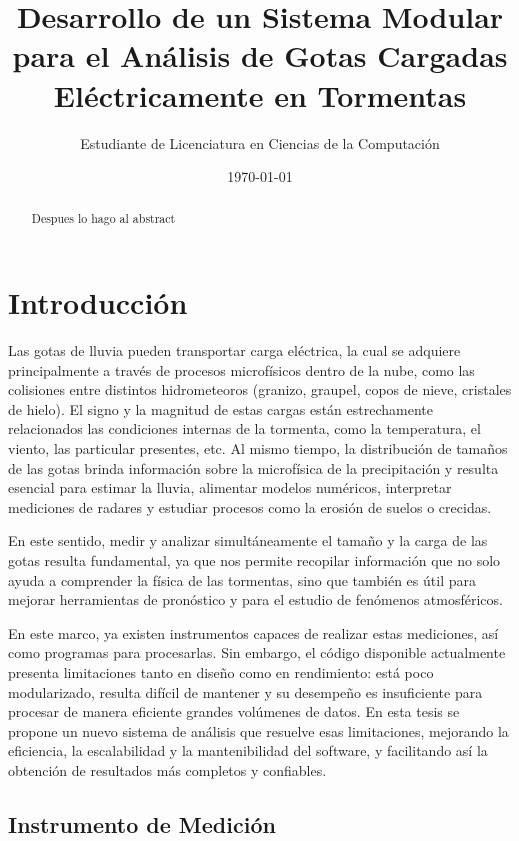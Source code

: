 \documentclass[12pt,a4paper]{article}
\title{\textbf{Desarrollo de un Sistema Modular para el Análisis de Gotas Cargadas Eléctricamente en Tormentas}}
\author{Estudiante de Licenciatura en Ciencias de la Computación}
\date{\today}
\begin{document}
\onehalfspacing

\maketitle

\begin{abstract}
    Despues lo hago al abstract
\end{abstract}

\tableofcontents
\newpage

\section{Introducción}
\lhead{}

Las gotas de lluvia pueden transportar carga eléctrica, la cual se adquiere principalmente a través de procesos microfísicos dentro de la nube, como las colisiones entre distintos hidrometeoros (granizo, graupel, copos de nieve, cristales de hielo). El signo y la magnitud de estas cargas están estrechamente relacionados las condiciones internas de la tormenta, como la temperatura, el viento, las particular presentes, etc. Al mismo tiempo, la distribución de tamaños de las gotas brinda información sobre la microfísica de la precipitación y resulta esencial para estimar la lluvia, alimentar modelos numéricos, interpretar mediciones de radares y estudiar procesos como la erosión de suelos o crecidas.

En este sentido, medir y analizar simultáneamente el tamaño y la carga de las gotas resulta fundamental, ya que nos permite recopilar información que no solo ayuda a comprender la física de las tormentas, sino que también es útil para mejorar herramientas de pronóstico y para el estudio de fenómenos atmosféricos.

En este marco, ya existen instrumentos capaces de realizar estas mediciones, así como programas para procesarlas. Sin embargo, el código disponible actualmente presenta limitaciones tanto en diseño como en rendimiento: está poco modularizado, resulta difícil de mantener y su desempeño es insuficiente para procesar de manera eficiente grandes volúmenes de datos. En esta tesis se propone un nuevo sistema de análisis que resuelve esas limitaciones, mejorando la eficiencia, la escalabilidad y la mantenibilidad del software, y facilitando así la obtención de resultados más completos y confiables.

\subsection{Instrumento de Medición}
\lhead{}
\end{document}
